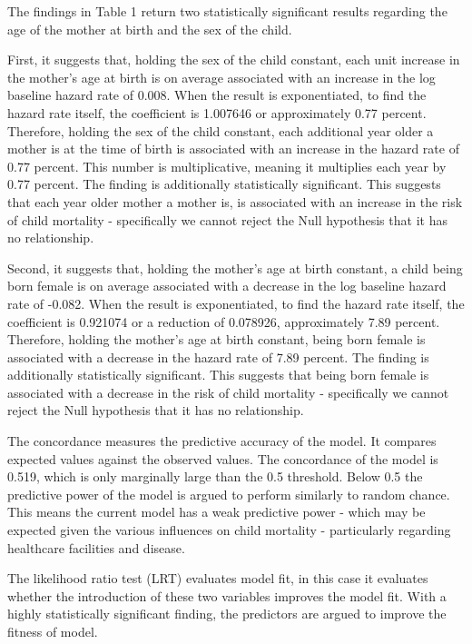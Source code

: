 \documentclass[12pt,letterpaper]{article}
\begin{document}
	The findings in Table 1 return two statistically significant results regarding the age of the mother at birth and the sex of the child.
	
	First, it suggests that, holding the sex of the child constant, each unit increase in the mother's age at birth is on average associated with an increase in the log baseline hazard rate of 0.008. When the result is exponentiated, to find the hazard rate itself, the coefficient is 1.007646 or approximately 0.77 percent. Therefore, holding the sex of the child constant, each additional year older a mother is at the time of birth is associated with an increase in the hazard rate of 0.77 percent. This number is multiplicative, meaning it multiplies each year by 0.77 percent. The finding is additionally statistically significant. This suggests that each year older mother a mother is, is associated with an increase in the risk of child mortality - specifically we cannot reject the Null hypothesis that it has no relationship.
	
	Second, it suggests that, holding the mother's age at birth constant, a child being born female is on average associated with a decrease in the log baseline hazard rate of -0.082. When the result is exponentiated, to find the hazard rate itself, the coefficient is 0.921074 or a reduction of 0.078926, approximately 7.89 percent. Therefore, holding the mother's age at birth constant, being born female is associated with a decrease in the hazard rate of 7.89 percent. The finding is additionally statistically significant. This suggests that being born female is associated with a decrease in the risk of child mortality - specifically we cannot reject the Null hypothesis that it has no relationship.
	
	The concordance measures the predictive accuracy of the model. It compares expected values against the observed values. The concordance of the model is 0.519, which is only marginally large than the 0.5 threshold. Below 0.5 the predictive power of the model is argued to perform similarly to random chance. This means the current model has a weak predictive power - which may be expected given the various influences on child mortality - particularly regarding healthcare facilities and disease.
	
	The likelihood ratio test (LRT) evaluates model fit, in this case it evaluates whether the introduction of these two variables improves the model fit. With a highly statistically significant finding, the predictors are argued to improve the fitness of model.
	
\end{document}

